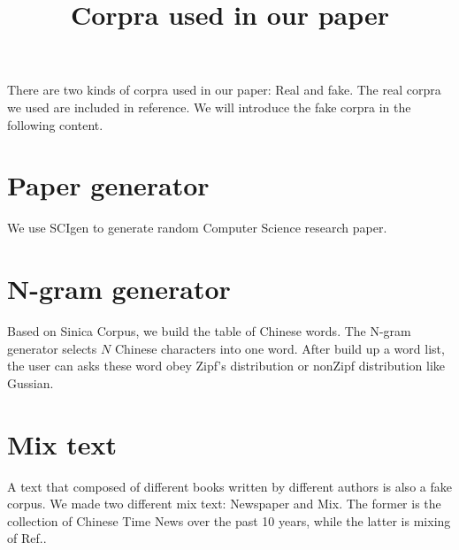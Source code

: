 \documentclass[a4paper]{article}
\begin{document}
\title{Corpra used in our paper}
\maketitle

There are two kinds of corpra used in our paper: Real and fake. The real corpra we used are included in reference. We will introduce the fake corpra in the following content.

\section{Paper generator}
We use SCIgen\cite{PG} to generate random Computer Science research paper.
\section{N-gram generator}
Based on Sinica Corpus, we build the table of Chinese words. The N-gram generator\cite{NG} selects $N$ Chinese characters into one word. After build up a word list, the user can asks these word obey Zipf's distribution or nonZipf distribution like Gussian. 
\section{Mix text}
A text that composed of different books written by different authors is also a fake corpus. We made two different mix text: Newspaper and Mix. The former is the collection of Chinese Time News over the past 10 years, while the latter is mixing of Ref.\cite{Foong}\cite{Yu}\cite{forg}.
\end{document}
